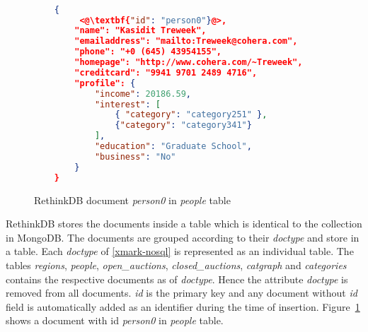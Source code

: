 \begin{figure}[hbtp]
\centering
\begin{lstlisting}[language=JSON,basicstyle =\scriptsize]

	{
		 <@\textbf{"id": "person0"}@>,
		"name": "Kasidit Treweek",
		"emailaddress": "mailto:Treweek@cohera.com",
		"phone": "+0 (645) 43954155",
		"homepage": "http://www.cohera.com/~Treweek",
		"creditcard": "9941 9701 2489 4716",
		"profile": {
			"income": 20186.59,
			"interest": [
			    { "category": "category251" },
				{"category": "category341"}
			],
			"education": "Graduate School",
			"business": "No"
		}
	}
\end{lstlisting}
\caption{RethinkDB document \textit{person0} in \textit{people} table}
\label{code:rethindb-person0}
\end{figure}
RethinkDB stores the documents inside a table which is identical to the collection in MongoDB. 
The documents are grouped according to their \textit{doctype} and store in a table.
Each \textit{doctype} of \ref{xmark-nosql} is represented as an individual table. 
The tables \textit{regions}, \textit{people}, \textit{open\_auctions}, \textit{closed\_auctions}, \textit{catgraph} and \textit{categories} contains the respective documents as of \textit{doctype}. Hence the attribute \textit{doctype} is removed from all documents.  \textit{id} is the primary key and any document without \textit{id} field is automatically added as an identifier during the time of insertion. Figure~\ref{code:rethindb-person0} shows a document with id \textit{person0} in \textit{people} table.
